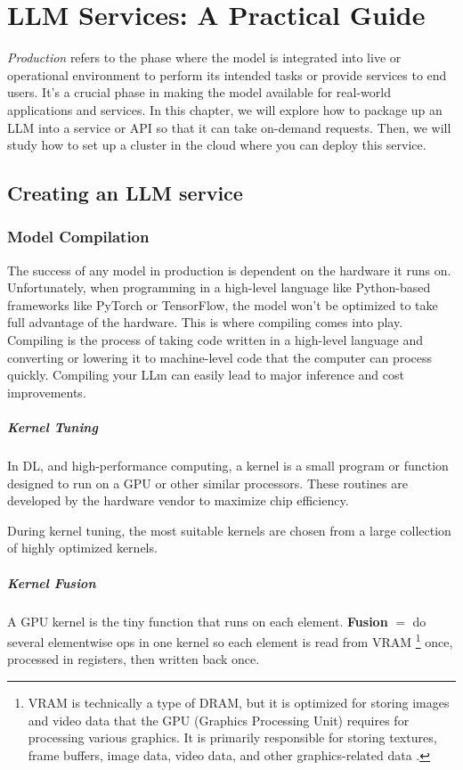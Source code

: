 \chapter{LLM Services: A Practical Guide}

\textit{Production} refers to the phase where the model is integrated into live or operational environment to perform its intended tasks or provide services to end users. It's a crucial phase in making the model available for real-world applications and services. In this chapter, we will explore how to package up an LLM into a service or API so that it can take on-demand requests. Then, we will study how to set up a cluster in the cloud where you can deploy this service. 

\section{Creating an LLM service}

\subsection{Model Compilation}
The success of any model in production is dependent on the hardware it runs on. Unfortunately, when programming in a high-level language like Python-based frameworks like PyTorch or TensorFlow, the model won't be optimized to take full advantage of the hardware. This is where compiling comes into play. Compiling is the process of taking code written in a high-level language and converting or lowering it to machine-level code that the computer can process quickly. Compiling your LLm can easily lead to major inference and cost improvements. 

\paragraph{Kernel Tuning} In DL, and high-performance computing, a kernel is a small program or function designed to run on a GPU or other similar processors. These routines are developed by the hardware vendor to maximize chip efficiency. 

During kernel tuning, the most suitable kernels are chosen from a large collection of highly optimized kernels. 


\paragraph{Kernel Fusion}
A GPU kernel is the tiny function that runs on each element. \textbf{Fusion} $=$ do several elementwise ops in one kernel so each element is read from VRAM \footnote{VRAM is technically a type of DRAM, but it is optimized for storing images and video data that the GPU (Graphics Processing Unit) requires for processing various graphics. It is primarily responsible for storing textures, frame buffers, image data, video data, and other graphics-related data \cite{Anshul2024}.} once, processed in registers, then written back once.

